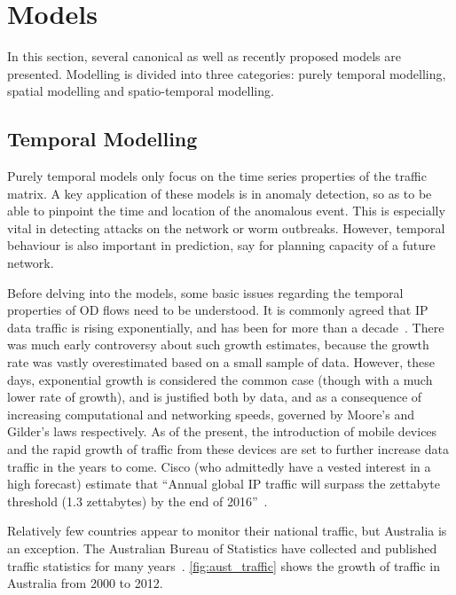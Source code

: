 \section{Models}
\label{sec:models}

In this section, several canonical as well as recently proposed models
are presented. Modelling is divided into three categories: purely
temporal modelling, spatial modelling and spatio-temporal modelling.
 
\subsection{Temporal Modelling}
\label{ssec:temporal_modelling}

Purely temporal models only focus on the time series properties of the
traffic matrix. A key application of these models is in anomaly
detection, so as to be able to pinpoint the time and location of the
anomalous event. This is especially vital in detecting attacks on the
network or worm outbreaks. However, temporal behaviour is also
important in prediction, say for planning capacity of a future
network.

Before delving into the models, some basic issues regarding the
temporal properties of OD flows need to be understood. It is commonly
agreed that IP data traffic is rising exponentially, and has been for
more than a 
decade~\cite{claffy94:_track_long_term_growt_of_nsfnet,groschwitz94:_time_series_model_of_long,odlyzko03:_internet_growth,cisco_visual_networ_index2011}. There
was much early controversy about such growth estimates, because the
growth rate was vastly overestimated based on a small sample of
data. However, these days, exponential growth is considered the common
case (though with a much lower rate of growth), and is justified both
by data, and as a consequence of increasing computational and
networking speeds, governed by Moore's and Gilder's laws
respectively. As of the present, the introduction of mobile devices
and the rapid growth of traffic from these devices are set to further
increase data traffic in the years to come. Cisco (who admittedly have
a vested interest in a high forecast) estimate that ``Annual global IP
traffic will surpass the zettabyte threshold (1.3 zettabytes) by the
end of 2016''~\cite{cisco_visual_networ_index2011}.

Relatively few countries appear to monitor their national traffic, but
Australia is an exception. The Australian Bureau of Statistics have
collected and published traffic statistics for many
years~\cite{13:_abs_internet}. \autoref{fig:aust_traffic} shows the
growth of traffic in Australia from 2000 to 2012.
 
